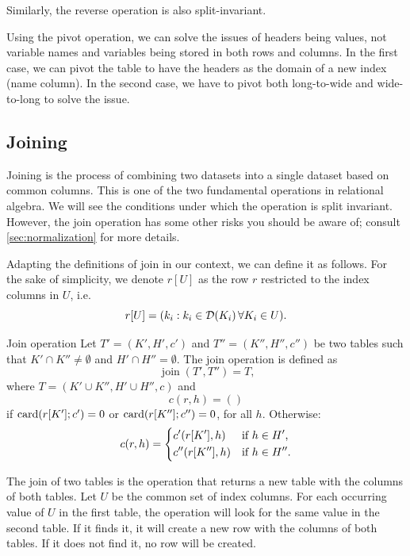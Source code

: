 Similarly, the reverse operation is also split-invariant.

Using the pivot operation, we can solve the issues of headers being values, not variable
names and variables being stored in both rows and columns.  In the first case, we can pivot
the table to have the headers as the domain of a new index (name column).  In the second
case, we have to pivot both long-to-wide and wide-to-long to solve the issue.

\subsection{Joining}

Joining is the process of combining two datasets into a single dataset based on common
columns.  This is one of the two fundamental operations in relational algebra. We will see
the conditions under which the operation is split invariant. However, the join operation
has some other risks you should be aware of; consult \cref{sec:normalization} for more
details.

Adapting the definitions of join in our context, we can define it as follows.
For the sake of simplicity, we denote $r[U]$ as the row $r$ restricted to the index
columns in $U$, i.e.
\begin{equation*}
  r[U] = (k_i : k_i \in \domainof{K_i} \forall K_i \in U)\text{.}
\end{equation*}

\begin{definition}{Join operation}\label{def:join}
  Let $T' = (K', H', c')$ and $T'' = (K'', H'', c'')$ be two tables such that $K'
  \cap K'' \neq \emptyset$ and $H' \cap H'' = \emptyset$.  The join operation is
  defined as \[
    \operatorname{join}(T', T'') = T\text{,}
  \] where $T = (K' \cup K'', H' \cup H'', c)$ and \[
    c(r, h) = ()
  \] if $\rowcard[{r[K']; c'}] = 0$ or $\rowcard[{r[K'']; c''}] = 0$, for all $h$.
  Otherwise: \[
    c(r, h) = \begin{dcases}
      c'(r[K'], h) & \text{if } h \in H'\text{,} \\
      c''(r[K''], h) & \text{if } h \in H''\text{.}
    \end{dcases}
  \]
\end{definition}

The join of two tables is the operation that returns a new table with the columns of both
tables.  Let $U$ be the common set of index columns.  For each occurring value of $U$ in
the first table, the operation will look for the same value in the second table.  If it
finds it, it will create a new row with the columns of both tables.  If it does not find
it, no row will be created.

